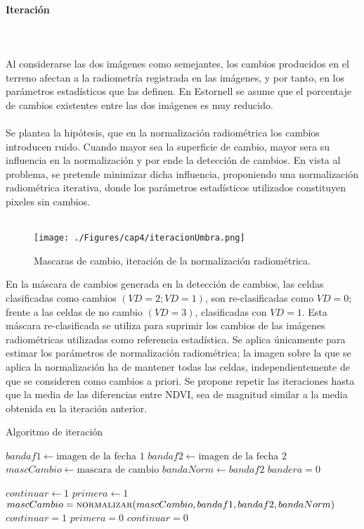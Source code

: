 \paragraph{Iteraci\'on}\mbox{}\\\mbox{}\\
Al considerarse las dos im\'agenes como semejantes, los cambios producidos en el terreno afectan a la radiometría registrada en las imágenes, y por tanto, en los parámetros estadísticos que las definen. En Estornell\cite{estornell2004analisis} se asume que el porcentaje de cambios existentes entre las dos im\'agenes es muy reducido.\\~\\
Se plantea la hip\'otesis, que en la normalizaci\'on radiom\'etrica los cambios introducen ruido. Cuando mayor sea la superficie de cambio, mayor sera su influencia en la normalizaci\'on y por ende la detecci\'on de cambios. En vista al problema, se pretende minimizar dicha influencia, proponiendo una normalizaci\'on radiom\'etrica iterativa, donde los par\'ametros estad\'isticos utilizados constituyen pixeles sin cambios. \\~\\
	\begin{figure}[H]
		\centering
		\texttt{[image: ./Figures/cap4/iteracionUmbra.png]}
		\caption{Mascaras de cambio, iteraci\'on de la normalizaci\'on radiom\'etrica.}
		\label{fig:umbrales}
	\end{figure}
En la máscara de cambios generada en la detección de cambios, las celdas clasificadas como cambios $ (VD = 2; VD = 1) $, son re-clasificadas como $ VD=0 $; frente a las celdas de no cambio $(VD = 3)  $, clasificadas con $ VD=1 $. Esta máscara re-clasificada se utiliza para suprimir los cambios de las im\'agenes radiom\'etricas utilizadas como referencia estad\'istica. Se aplica \'unicamente para estimar los par\'ametros de normalizaci\'on radiom\'etrica; la imagen sobre la que se aplica la normalizaci\'on ha de mantener todas las
celdas, independientemente de que se consideren como cambios a priori. Se propone repetir las iteraciones hasta que la media de las diferencias entre NDVI, sea de magnitud similar a la media obtenida en la iteraci\'on anterior. 
\begin{algorithm}
	\caption{Algoritmo de iteraci\'on}
	\label{alg:iteracionAlg}
	\begin{algorithmic}[1]
	\Statex
	
	\State $ bandaf1 \gets \text{imagen de la fecha 1} $ 
	\State $ bandaf2 \gets \text{imagen de la fecha 2} $ 
	\State $ mascCambio \gets \text{mascara de cambio} $ 
	\State $ bandaNorm \gets bandaf2$ 
	\State $ bandera = 0$

	
	\State 
	\State $ continuar \gets 1 $ 
	\State $ primera \gets 1 $ 
			\State $ mascCambio = \textsc{normalizar}(mascCambio,bandaf1,bandaf2,bandaNorm)$ 
				\State $ continuar = 1 $ 
				\State $ primera = 0 $ 
			\Else
				\State $continuar = 0$
			\EndIf
	\EndWhile
	
	\end{algorithmic}
\end{algorithm}


